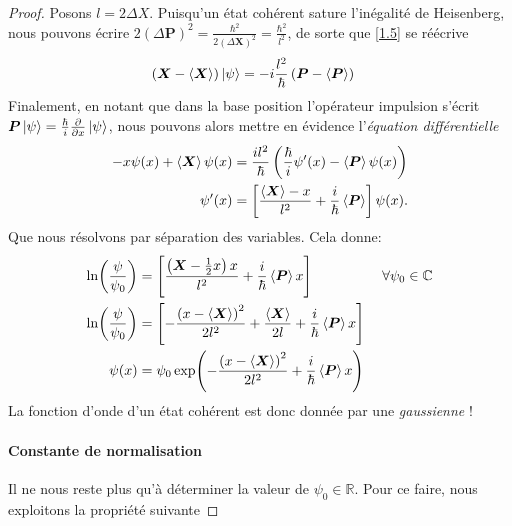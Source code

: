 \documentclass[11pt,oneside,a4paper]{article}
\newcommand{\h}{\ensuremath{\hbar}}
\begin{document}
\begin{proof}
Posons $l = 2\Delta X$. Puisqu'un état cohérent sature l'inégalité de Heisenberg, nous pouvons écrire $2\left(\Delta\bm{P}\right)^2 = \frac{\h^2}{2\left(\Delta\bm{X}\right)^2} = \frac{\h^2}{l^2}$, de sorte que \eqref{1.5} se réécrive
\begin{align}
  \left(\bm{X}-\expval{\bm{X}}\right)\ket{\psi} &= -i\frac{l^2}{\h}\left(\bm{P}-\expval{\bm{P}}\right)\label{1.6}
\end{align}
Finalement, en notant que dans la base position l'opérateur impulsion s'écrit $\bm{P}\ket{\psi} = \frac{\h}{i}\frac{\partial}{\partial x}\ket{\psi}$, nous pouvons alors mettre en évidence l'\emph{équation différentielle}
\begin{align}
  -x\psi(x)+\expval{\bm{X}}\psi(x)&=\frac{il^2}{\h}\left(\frac{\h}{i}\psi'(x)-\expval{\bm{P}}\psi(x)\right)\notag\\
  \psi'(x) &= \left[\frac{\expval{\bm{X}}-x}{l^2}+\frac{i}{\h}\expval{\bm{P}}\right]\psi(x).\notag
\end{align}
Que nous résolvons par séparation des variables. Cela donne:
\begin{align}
  \ln(\frac{\psi}{\psi_0}) &= \left[\frac{\left(\bm{X}-\frac{1}{2}x\right)x}{l^2}+\frac{i}{\h}\expval{\bm{P}}x\right]   &\; \forall\psi_0\in\mathbb{C}\notag\\
  \ln(\frac{\psi}{\psi_0}) &= \left[-\frac{\left(x-\expval{\bm{X}}\right)^2}{2l^2}+\frac{\expval{\bm{X}}}{2l}+\frac{i}{\h}\expval{\bm{P}}x\right]\notag\\
  \psi(x) &= \psi_0\exp(-\frac{\left(x-\expval{\bm{X}}\right)^2}{2l^2}+\frac{i}{\h}\expval{\bm{P}}x)
\end{align}
La fonction d'onde d'un état cohérent est donc donnée par une \emph{gaussienne} !

\paragraph{Constante de normalisation}
Il ne nous reste plus qu'à déterminer la valeur de $\psi_0\in\mathbb{R}$. Pour ce faire, nous exploitons la propriété suivante


\end{proof}
\end{document}
